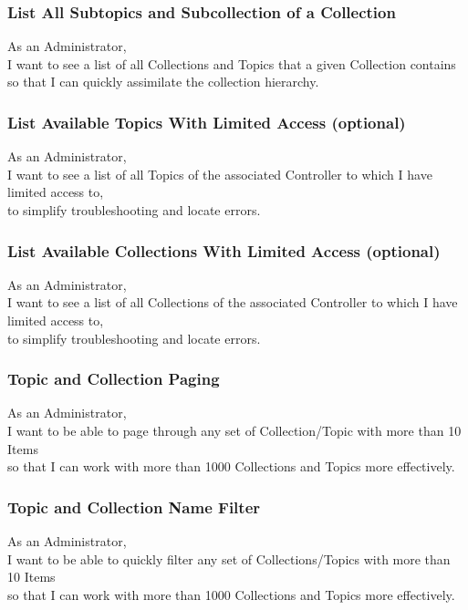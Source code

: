 \subsubsection{List All Subtopics and Subcollection of a Collection}
As an Administrator,\\
I want to see a list of all Collections and Topics that a given Collection contains\\
so that I can quickly assimilate the collection hierarchy.

\subsubsection{List Available Topics With Limited Access (optional)}

As an Administrator,\\
I want to see a list of all Topics of the associated Controller to which I have limited access to,\\
to simplify troubleshooting and locate errors.

\subsubsection{List Available Collections With Limited Access (optional)}

As an Administrator,\\
I want to see a list of all Collections of the associated Controller to which I have limited access to,\\
to simplify troubleshooting and locate errors.

\subsubsection{Topic and Collection Paging}
As an Administrator,\\
I want to be able to page through any set of Collection/Topic with more than 10 Items \\
so that I can work with more than 1000 Collections and Topics more effectively.

\subsubsection{Topic and Collection Name Filter}\label{sec:requirement-topic-filter}
As an Administrator,\\
I want to be able to quickly filter any set of Collections/Topics with more than 10 Items \\
so that I can work with more than 1000 Collections and Topics more effectively.

